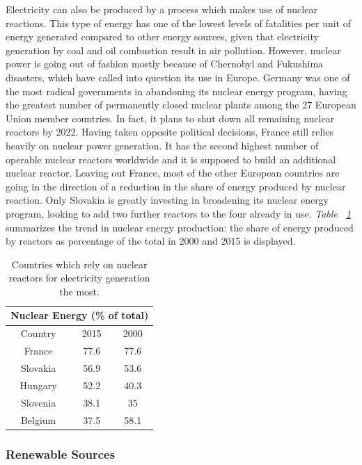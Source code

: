 \documentclass[a4paper,12pt]{book}
\begin{document}
Electricity can also be produced by a process which makes use of nuclear reactions. This type of energy has one of the lowest levels of fatalities per unit of energy generated compared to other energy sources, given that electricity generation by coal and oil combustion result in air pollution. \cite{markandya2007electricity} However, nuclear power is going out of fashion mostly because of Chernobyl and Fukushima disasters, which have called into question its use in Europe. Germany was one of the most radical governments in abandoning its nuclear energy program, having the greatest number of permanently closed nuclear plants among the 27 European Union member countries. In fact, it plans to shut down all remaining nuclear reactors by 2022. Having taken opposite political decisions, France still relies heavily on nuclear power generation. It has the second highest number of operable nuclear reactors worldwide and it is supposed to build an additional nuclear reactor. Leaving out France, most of the other European countries are going in the direction of a reduction in the share of energy produced by nuclear reaction. Only Slovakia is greatly investing in broadening its nuclear energy program, looking to add two further reactors to the four already in use. \textit{Table ~\ref{Tab:nucE}} summarizes the trend in nuclear energy production: the share of energy produced by reactors as percentage of the total in 2000 and 2015 is displayed.

\begin{table}[tb]
\begin{center}
\begin{tabular}{|c|c|c|}
\hline
\multicolumn{3}{|c|}{Nuclear Energy (\% of total)}\\
\hline
Country & 2015 & 2000 \\
\hline
France & 77.6 & 77.6 \\
Slovakia & 56.9 & 53.6 \\
Hungary & 52.2 & 40.3 \\
Slovenia & 38.1 & 35 \\
Belgium & 37.5 & 58.1\\
\hline
\end{tabular}
\caption{Countries which rely on nuclear reactors for electricity generation the most.}
\label{Tab:nucE}
\end{center}
\end{table}

\subsubsection*{Renewable Sources}
\end{document}
